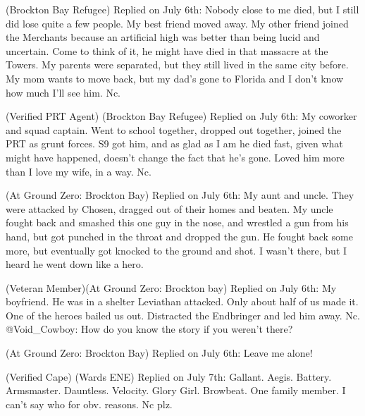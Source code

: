 


\blacktriangleright {} (Brockton Bay Refugee)
Replied on July 6th:
Nobody close to me died, but I still did lose quite a few people.  My best friend moved away.  My other friend joined the Merchants because an artificial high was better than being lucid and uncertain.  Come to think of it, he might have died in that massacre at the Towers.  My parents were separated, but they still lived in the same city before.  My mom wants to move back, but my dad's gone to Florida and I don't know how much I'll see him.
Nc.\strong{ }



\blacktriangleright  {} (Verified PRT Agent) (Brockton Bay Refugee)
Replied on July 6th:
My coworker and squad captain.  Went to school together, dropped out together, joined the PRT as grunt forces.  S9 got him, and as glad as I am he died fast, given what might have happened, doesn't change the fact that he's gone.  Loved him more than I love my wife, in a way.
Nc.



\blacktriangleright  {}(At Ground Zero: Brockton Bay)
Replied on July 6th:
My aunt and uncle.  They were attacked by Chosen, dragged out of their homes and beaten.  My uncle fought back and smashed this one guy in the nose, and wrestled a gun from his hand, but got punched in the throat and dropped the gun.  He fought back some more, but eventually got knocked to the ground and shot.  I wasn't there, but I heard he went down like a hero.



\blacktriangleright  {}(Veteran Member)\strong{ }(At Ground Zero: Brockton bay)
Replied on July 6th:
My boyfriend.  He was in a shelter Leviathan attacked.  Only about half of us made it.  One of the heroes bailed us out.  Distracted the Endbringer and led him away.  Nc.
@Void_Cowboy: How do you know the story if you weren't there?



\blacktriangleright {}(At Ground Zero: Brockton Bay)
Replied on July 6th:
Leave me alone!



\blacktriangleright {} (Verified Cape) (Wards ENE)
Replied on July 7th:
Gallant.  Aegis.  Battery.  Armsmaster.  Dauntless.  Velocity.  Glory Girl.  Browbeat.  One family member. I can't say who for obv. reasons.
Nc plz.



